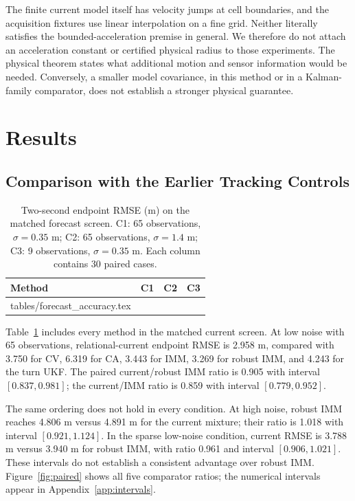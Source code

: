 \documentclass[journal]{IEEEtran}
\makeatletter
\newcommand{\inputrows}[1]{\@@input #1 }
\makeatother
\begin{document}
The finite current model itself has velocity jumps at cell boundaries,
and the acquisition fixtures use linear interpolation on a fine grid.
Neither literally satisfies the bounded-acceleration premise in general.
We therefore do not attach an acceleration constant or certified physical
radius to those experiments. The physical theorem states what additional
motion and sensor information would be needed. Conversely, a smaller
model covariance, in this method or in a Kalman-family comparator, does
not establish a stronger physical guarantee.

\section{Results}
\label{sec:results}

\subsection{Comparison with the Earlier Tracking Controls}

\begin{table}[t]
\centering
\caption{Two-second endpoint RMSE (m) on the matched forecast screen.
C1: 65 observations, $\sigma=0.35$ m; C2: 65 observations,
$\sigma=1.4$ m; C3: 9 observations, $\sigma=0.35$ m.
Each column contains 30 paired cases.}
\label{tab:forecast}
\small
\begin{tabular}{lrrr}
\toprule Method & C1 & C2 & C3\\\midrule
\inputrows{tables/forecast_accuracy.tex}
\bottomrule
\end{tabular}
\end{table}

Table~\ref{tab:forecast} includes every method in the matched current
screen. At low noise with 65 observations, relational-current endpoint
RMSE is 2.958 m, compared with 3.750 for CV, 6.319 for CA, 3.443 for IMM,
3.269 for robust IMM, and 4.243 for the turn UKF. The paired current/robust
IMM ratio is 0.905 with interval $[0.837,0.981]$; the current/IMM ratio is
0.859 with interval $[0.779,0.952]$.

The same ordering does not hold in every condition. At high noise,
robust IMM reaches 4.806 m versus 4.891 m for the current mixture; their
ratio is 1.018 with interval $[0.921,1.124]$. In the sparse low-noise
condition, current RMSE is 3.788 m versus 3.940 m for robust IMM, with
ratio 0.961 and interval $[0.906,1.021]$. These intervals do not establish
a consistent advantage over robust IMM. Figure~\ref{fig:paired} shows
all five comparator ratios; the numerical intervals appear in
Appendix~\ref{app:intervals}.
\end{document}
